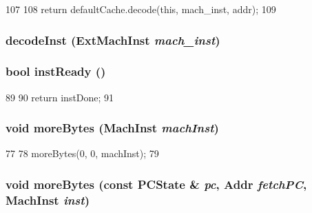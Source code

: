 \begin{DoxyCode}
107     {
108         return defaultCache.decode(this, mach_inst, addr);
109     }
\end{DoxyCode}
\hypertarget{classPowerISA_1_1Decoder_a148768e0e9062eb41f604040d0ea86e6}{
\subsubsection[{decodeInst}]{ decodeInst (ExtMachInst {\em mach\_\-inst})}}
\label{classPowerISA_1_1Decoder_a148768e0e9062eb41f604040d0ea86e6}
\hypertarget{classPowerISA_1_1Decoder_a9f6a0bc8946ca58d5d59a5dbc6a3181f}{
\subsubsection[{instReady}]{\setlength{\rightskip}{0pt plus 5cm}bool instReady ()}}
\label{classPowerISA_1_1Decoder_a9f6a0bc8946ca58d5d59a5dbc6a3181f}



\begin{DoxyCode}
89     {
90         return instDone;
91     }
\end{DoxyCode}
\hypertarget{classPowerISA_1_1Decoder_ad64ff6faaad6c993e98f9c2bcbf25f0e}{
\subsubsection[{moreBytes}]{\setlength{\rightskip}{0pt plus 5cm}void moreBytes ({\bf MachInst} {\em machInst})}}
\label{classPowerISA_1_1Decoder_ad64ff6faaad6c993e98f9c2bcbf25f0e}



\begin{DoxyCode}
77     {
78         moreBytes(0, 0, machInst);
79     }
\end{DoxyCode}
\hypertarget{classPowerISA_1_1Decoder_a85a99c8dd9425508bee9a17836dbbd12}{
\subsubsection[{moreBytes}]{\setlength{\rightskip}{0pt plus 5cm}void moreBytes (const PCState \& {\em pc}, \/  {\bf Addr} {\em fetchPC}, \/  {\bf MachInst} {\em inst})}}
\label{classPowerISA_1_1Decoder_a85a99c8dd9425508bee9a17836dbbd12}



